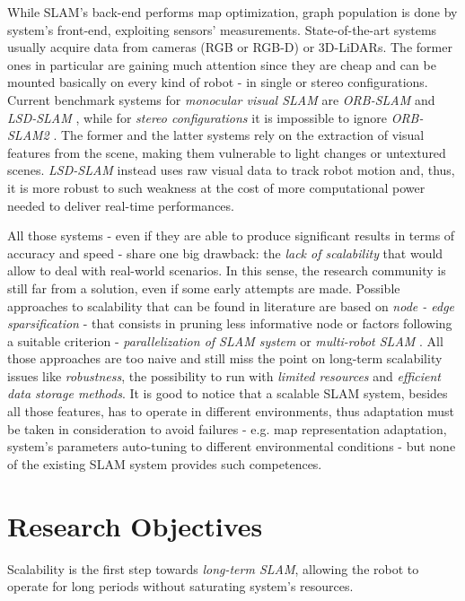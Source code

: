 \documentclass[10pt,a4paper, notitlepage]{report}
\begin{document}
While SLAM's back-end performs map optimization, graph population is done by system's front-end, exploiting sensors' measurements. State-of-the-art systems usually acquire data from cameras (RGB or RGB-D) or 3D-LiDARs. The former ones in particular are gaining much attention since they are cheap and can be mounted basically on every kind of robot - in single or stereo configurations. Current benchmark systems for \textit{monocular visual SLAM} are \textit{ORB-SLAM} \cite{mur2015orb-slam} and \textit{LSD-SLAM} \cite{engel2014lsd-slam}, while for \textit{stereo configurations} it is impossible to ignore \textit{ORB-SLAM2} \cite{mur2017orb-slam2}. The former and the latter systems rely on the extraction of visual features from the scene, making them vulnerable to light changes or untextured scenes. \textit{LSD-SLAM} instead uses raw visual data to track robot motion and, thus, it is more robust to such weakness at the cost of more computational power needed to deliver real-time performances.

All those systems - even if they are able to produce significant results in terms of accuracy and speed - share one big drawback: the \textit{lack of scalability} that would allow to deal with real-world scenarios. In this sense, the research community is still far from a solution, even if some early attempts are made. Possible approaches to scalability that can be found in literature are based on \textit{node - edge sparsification} \cite{kretzschmar2011graph-pruninig} \cite{huang2013consistent} - that consists in pruning less informative node or factors following a suitable criterion - \textit{parallelization of SLAM system} \cite{ni-dallaert2010nested-dissections} \cite{ni-dallaert2007tectonicSAM} \cite{grisetti2010hogman} or \textit{multi-robot SLAM} \cite{cunningham2013ddfSAM2} \cite{lazaro2013mr-slam}. All those approaches are too naive and still miss the point on long-term scalability issues like \textit{robustness}, the possibility to run with \textit{limited resources} and \textit{efficient data storage methods}. It is good to notice that a scalable SLAM system, besides all those features, has to operate in different environments, thus adaptation must be taken in consideration to avoid failures - e.g. map representation adaptation, system's parameters auto-tuning to different environmental conditions - but none of the existing SLAM system provides such competences.

\section*{Research Objectives}
Scalability is the first step towards \textit{long-term SLAM}, allowing the robot to operate for long periods without saturating system's resources. 
\end{document}
